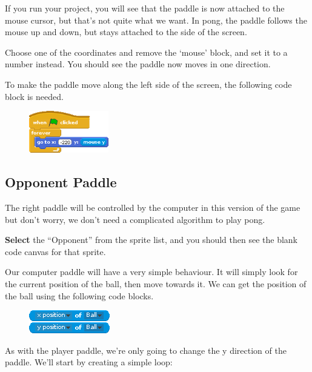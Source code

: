		If you run your project, you will see that the paddle is now attached to the mouse cursor, but that's not quite what we want. In pong, the paddle follows the mouse up and down, but stays attached to the side of the screen.
		
		Choose one of the coordinates and remove the `mouse' block, and set it to a number instead. You should see the paddle now moves in one direction.
		
		To make the paddle move along the left side of the screen, the following code block is needed.
		
		\begin{figure}[h!]
			\centering
			\includegraphics[height=69px]{McrRaspJam/018_ScratchGames/code/1_followmouse2}
			\label{fig:followmouse2}
		\end{figure}
		
	\subsection{Opponent Paddle}
	
		The right paddle will be controlled by the computer in this version of the game but don't worry, we don't need a complicated algorithm to play pong.
		
		\textbf{Select} the ``Opponent'' from the sprite list, and you should then see the blank code canvas for that sprite.
		
		Our computer paddle will have a very simple behaviour. It will simply look for the current position of the ball, then move towards it. We can get the position of the ball using the following code blocks.
		
		\begin{figure}[h!]
			\centering
			\includegraphics[height=38px]{McrRaspJam/018_ScratchGames/code/2_ballpos}
			\label{fig:ballpos}
		\end{figure}
	
		As with the player paddle, we're only going to change the y direction of the paddle. We'll start by creating a simple loop:
		
